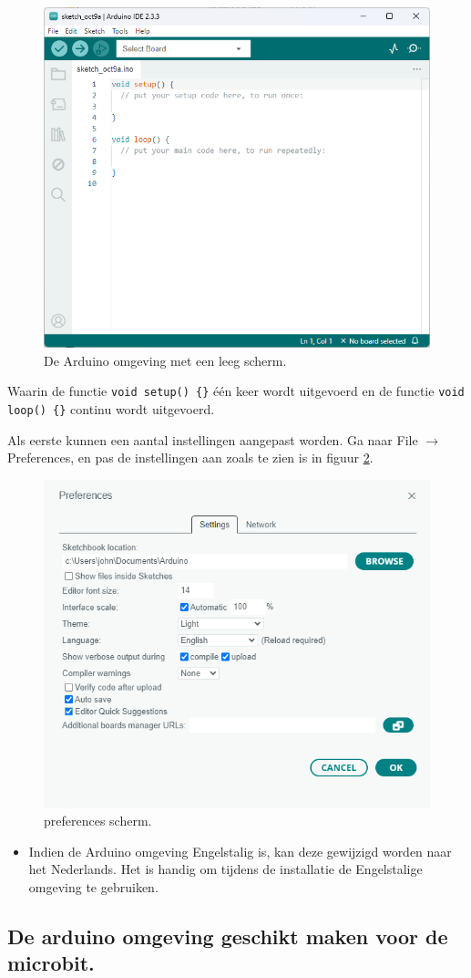 \begin{figure}[h!]
	\captionsetup{justification=centering}
	\includegraphics[width=0.50 \linewidth]{figuren/arduino_s1}
	\centering
	\caption{De Arduino omgeving met een leeg scherm.}
	\label{fig:arduino_s1}
\end{figure}
Waarin de functie \lstinline |void setup() {}| één keer wordt uitgevoerd en de functie \lstinline |void loop() {}| continu wordt uitgevoerd.


Als eerste kunnen een aantal instellingen aangepast worden. Ga naar File $\rightarrow$ Preferences, en pas de instellingen aan zoals te zien is in figuur \ref{fig:arduinoPref}.
\begin{figure}[H]
	\captionsetup{justification=centering}
	\includegraphics[width=0.50 \linewidth]{figuren/arduinoPref}
	\centering
	\caption{preferences scherm.}
	\label{fig:arduinoPref}
\end{figure}

\begin{itemize}
	\item Indien de Arduino omgeving Engelstalig is, kan deze gewijzigd worden naar het Nederlands. Het is handig om tijdens de installatie de Engelstalige omgeving te gebruiken.
\end{itemize}
\subsection{De arduino omgeving geschikt maken voor de microbit.}

